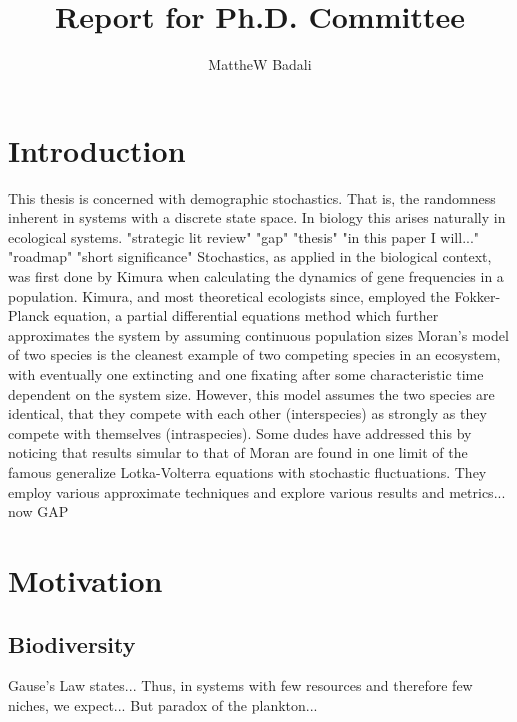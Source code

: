 \documentclass[a4paper,11pt]{article}
\title{Report for Ph.D. Committee}
\author{MattheW Badali}
\numberwithin{equation}{section} %
\begin{document}

\fi


\section{Introduction}

This thesis is concerned with demographic stochastics. That is, the randomness inherent in systems with a discrete state space. 
In biology this arises naturally in ecological systems. 
"strategic lit review"
"gap"
"thesis" "in this paper I will..."
"roadmap"
"short significance"
Stochastics, as applied in the biological context, was first done by Kimura when calculating the dynamics of gene frequencies in a population. %
Kimura, and most theoretical ecologists since, employed the Fokker-Planck equation, a partial differential equations method which further approximates the system by assuming continuous population sizes %
Moran's model of two species is the cleanest example of two competing species in an ecosystem, with eventually one extincting and one fixating after some characteristic time dependent on the system size. 
However, this model assumes the two species are identical, that they compete with each other (interspecies) as strongly as they compete with themselves (intraspecies). 
Some dudes have addressed this by noticing that results simular to that of Moran are found in one limit of the famous generalize Lotka-Volterra equations with stochastic fluctuations. 
They employ various approximate techniques and explore various results and metrics...
now GAP




\section{Motivation}
\subsection{Biodiversity}
Gause's Law states...
Thus, in systems with few resources and therefore few niches, we expect...
But paradox of the plankton...
\end{document}
